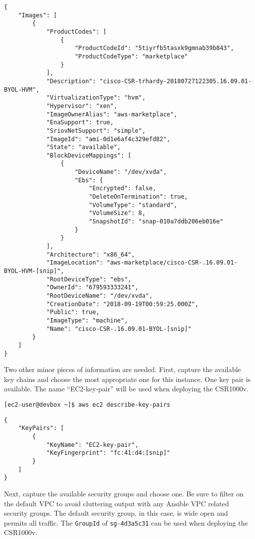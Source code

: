 \begin{verbatim}
{
    "Images": [
        {
            "ProductCodes": [
                {
                    "ProductCodeId": "5tiyrfb5tasxk9gmnab39b843", 
                    "ProductCodeType": "marketplace"
                }
            ], 
            "Description": "cisco-CSR-trhardy-20180727122305.16.09.01-BYOL-HVM", 
            "VirtualizationType": "hvm", 
            "Hypervisor": "xen", 
            "ImageOwnerAlias": "aws-marketplace", 
            "EnaSupport": true, 
            "SriovNetSupport": "simple", 
            "ImageId": "ami-0d1e6af4c329efd82", 
            "State": "available", 
            "BlockDeviceMappings": [
                {
                    "DeviceName": "/dev/xvda", 
                    "Ebs": {
                        "Encrypted": false, 
                        "DeleteOnTermination": true, 
                        "VolumeType": "standard", 
                        "VolumeSize": 8, 
                        "SnapshotId": "snap-010a7ddb206eb016e"
                    }
                }
            ], 
            "Architecture": "x86_64", 
            "ImageLocation": "aws-marketplace/cisco-CSR-.16.09.01-BYOL-HVM-[snip]", 
            "RootDeviceType": "ebs", 
            "OwnerId": "679593333241", 
            "RootDeviceName": "/dev/xvda", 
            "CreationDate": "2018-09-19T00:59:25.000Z", 
            "Public": true, 
            "ImageType": "machine", 
            "Name": "cisco-CSR-.16.09.01-BYOL-[snip]"
        }
    ]
}
\end{verbatim}

Two other minor pieces of information are needed. First, capture the available
key chains and choose the most appropriate one for this instance. One key pair
is available. The name ``EC2-key-pair'' will be used when deploying the CSR1000v.

\begin{verbatim}
[ec2-user@devbox ~]$ aws ec2 describe-key-pairs
\end{verbatim}

\begin{verbatim}
{
    "KeyPairs": [
        {
            "KeyName": "EC2-key-pair", 
            "KeyFingerprint": "fc:41:d4:[snip]"
        }
    ]
}
\end{verbatim}

Next, capture the available security groups and choose one. Be sure to filter
on the default VPC to avoid cluttering output with any Ansible VPC related
security groups. The default security group, in this case, is wide open and
permits all traffic. The \verb|GroupId| of \verb|sg-4d3a5c31| can be used
when deploying the CSR1000v.

